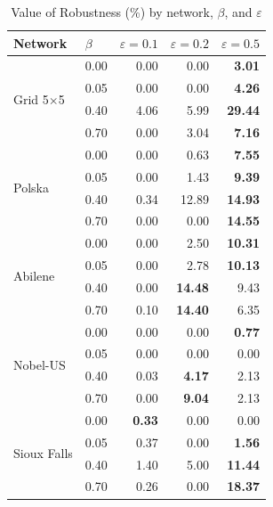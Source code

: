 \begin{table}[htbp]
\centering
\caption{Value of Robustness (\%) by network, $\beta$, and $\varepsilon$}
\label{tab:vor}
\begin{tabular}{ll rrr}
\toprule
Network & $\beta$ & $\varepsilon=0.1$ & $\varepsilon=0.2$ & $\varepsilon=0.5$ \\
\midrule
 \multirow{4}{*}{Grid 5$\times$5} & 0.00 & 0.00 & 0.00 & \textbf{3.01} \\
  & 0.05 & 0.00 & 0.00 & \textbf{4.26} \\
  & 0.40 & 4.06 & 5.99 & \textbf{29.44} \\
  & 0.70 & 0.00 & 3.04 & \textbf{7.16} \\
\midrule
 \multirow{4}{*}{Polska} & 0.00 & 0.00 & 0.63 & \textbf{7.55} \\
  & 0.05 & 0.00 & 1.43 & \textbf{9.39} \\
  & 0.40 & 0.34 & 12.89 & \textbf{14.93} \\
  & 0.70 & 0.00 & 0.00 & \textbf{14.55} \\
\midrule
 \multirow{4}{*}{Abilene} & 0.00 & 0.00 & 2.50 & \textbf{10.31} \\
  & 0.05 & 0.00 & 2.78 & \textbf{10.13} \\
  & 0.40 & 0.00 & \textbf{14.48} & 9.43 \\
  & 0.70 & 0.10 & \textbf{14.40} & 6.35 \\
\midrule
 \multirow{4}{*}{Nobel-US} & 0.00 & 0.00 & 0.00 & \textbf{0.77} \\
  & 0.05 & 0.00 & 0.00 & 0.00 \\
  & 0.40 & 0.03 & \textbf{4.17} & 2.13 \\
  & 0.70 & 0.00 & \textbf{9.04} & 2.13 \\
\midrule
 \multirow{4}{*}{Sioux Falls} & 0.00 & \textbf{0.33} & 0.00 & 0.00 \\
  & 0.05 & 0.37 & 0.00 & \textbf{1.56} \\
  & 0.40 & 1.40 & 5.00 & \textbf{11.44} \\
  & 0.70 & 0.26 & 0.00 & \textbf{18.37} \\
\bottomrule
\end{tabular}
\end{table}